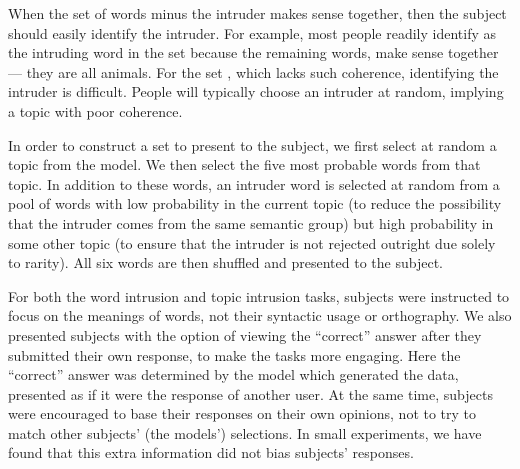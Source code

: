When the set of words minus the intruder makes sense together, then
the subject should easily identify the intruder.  For example, most
people readily identify  as the intruding word in the set
 because the remaining
words,  make sense together ---
they are all animals.  For the set , which lacks such coherence, identifying
the intruder is difficult.  People will typically choose an
intruder at random, implying a topic with poor coherence.



In order to construct a set to present to the subject, we first select
at random a topic from the model.  We then select the five most probable
words from that topic.  In addition to these words, an intruder word
is selected at random from a pool of words with low probability in the
current topic (to reduce the possibility that the intruder comes from
the same semantic group) but high probability in some other topic (to
ensure that the intruder is not rejected outright due solely to
rarity).  All six words are then shuffled and presented to the subject.



For both the word intrusion and topic intrusion tasks, subjects were
instructed to focus on the meanings of words, not their syntactic
usage or orthography.  We also presented subjects with the option of
viewing the ``correct'' answer after they submitted their own
response, to make the tasks more engaging.  Here the ``correct''
answer was determined by the model which generated the data, presented
as if it were the response of another user.  At the same time,
subjects were encouraged to base their responses on their own
opinions, not to try to match other subjects' (the models')
selections.  In small experiments, we have found that this extra
information did not bias subjects' responses.

